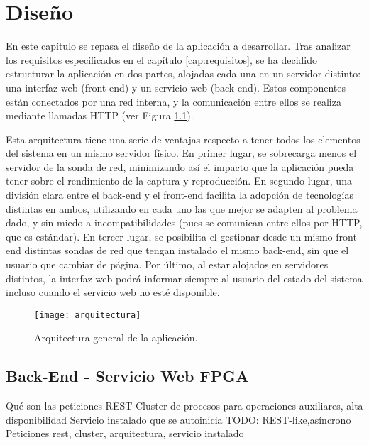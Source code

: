 \chapter{Diseño\label{cap:disenho}}

En este capítulo se repasa el diseño de la aplicación a desarrollar. Tras analizar los requisitos especificados en el capítulo \ref{cap:requisitos}, se ha decidido estructurar la aplicación en dos partes, alojadas cada una en un servidor distinto: una interfaz web (\gls{front-end}) y un servicio web (\gls{back-end}). Estos componentes están conectados por una red interna, y la comunicación entre ellos se realiza mediante llamadas  \gls{HTTP} (ver Figura \ref{fig:arquitectura}).

Esta arquitectura tiene una serie de ventajas respecto a tener todos los elementos del sistema en un mismo servidor físico.
En primer lugar, se sobrecarga menos el servidor de la sonda de red, minimizando así el impacto que la aplicación pueda tener sobre el rendimiento de la captura y reproducción.
En segundo lugar, una división clara entre el \gls{back-end} y el \gls{front-end} facilita la adopción de tecnologías distintas en ambos, utilizando en cada uno las que mejor se adapten al problema dado, y sin miedo a incompatibilidades (pues se comunican entre ellos por \gls{HTTP}, que es estándar).
En tercer lugar, se posibilita el gestionar desde un mismo \gls{front-end} distintas sondas de red que tengan instalado el mismo \gls{back-end}, sin que el usuario que cambiar de página.
Por último, al estar alojados en servidores distintos, la interfaz web podrá informar siempre al usuario del estado del sistema incluso cuando el servicio web no esté disponible.

\begin{figure}[!htp]
  \centering
  \texttt{[image: arquitectura]}
  \caption{Arquitectura general de la aplicación.}
  \label{fig:arquitectura}
\end{figure}


\section{Back-End - Servicio Web FPGA\label{sec:dis:servicio_web_fpga}}

Qué son las peticiones REST
Cluster de procesos para operaciones auxiliares, alta disponibilidad
Servicio instalado que se autoinicia
TODO: 
  {REST-like,asíncrono}
  Peticiones rest, cluster, arquitectura, servicio instalado

